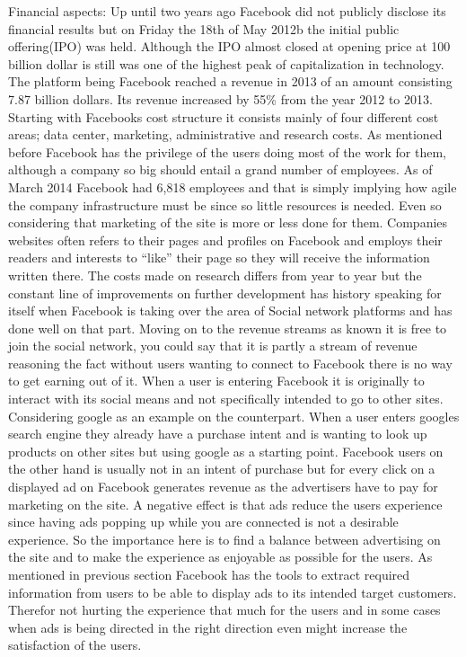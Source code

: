\documentclass[conference]{IEEEtran}
\begin{document}
Financial aspects:
Up until two years ago Facebook did not publicly disclose its ﬁnancial
results but on Friday the 18th of May 2012b the initial public offering(IPO) was held. Although the IPO almost closed at opening price at 100 billion dollar is still was one of the highest peak of capitalization in technology\cite{owyang2012}. The platform being Facebook reached a revenue in 2013 of an amount consisting 7.87 billion dollars. Its revenue increased by 55\% from the year 2012 to 2013. 
Starting with Facebooks cost structure it consists mainly of four different cost areas; data center, marketing, administrative and research costs. As mentioned before Facebook has the privilege of the users doing most of the work for them, although a company so big should entail a grand number of employees. As of March 2014 Facebook had 6,818 employees and that is simply implying how agile the company infrastructure must be since so little resources is needed\cite{BusinessFundamentals}. Even so considering that marketing of the site is more or less done for them. Companies websites often refers to their pages and profiles on Facebook and employs their readers and interests to “like” their page so they will receive the information written there. The costs made on research differs from year to year but the constant line of improvements on further development has history speaking for itself when Facebook is taking over the area of Social network platforms and has done well on that part. 
Moving on to the revenue streams as known it is free to join the social network, you could say that it is partly a stream of revenue reasoning the fact without users wanting to connect to Facebook there is no way to get earning out of it. When a user is entering Facebook it is originally to interact with its social means and not specifically intended to go to other sites. Considering google as an example on the counterpart. When a user enters googles search engine they already have a purchase intent and is wanting to look up products on other sites but using google as a starting point. Facebook users on the other hand is usually not in an intent of purchase but for every click on a displayed ad on Facebook generates revenue as the advertisers have to pay for marketing on the site. A negative effect is that ads reduce the users experience since having ads popping up while you are connected is not a desirable experience. So the importance here is to find a balance between advertising on the site and to make the experience as enjoyable as possible for the users. As mentioned in previous section Facebook has the tools to extract required information from users to be able to display ads to its intended target customers. Therefor not hurting the experience that much for the users and in some cases when ads is being directed in the right direction even might increase the satisfaction of the users. 
\end{document}
